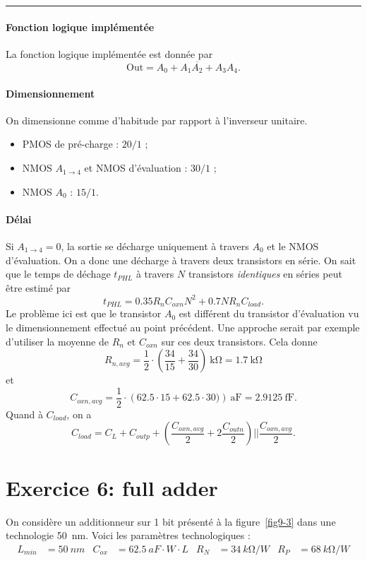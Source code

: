\documentclass[frenchb,DIV=14]{scrartcl}
\begin{document}
\hspace{1cm}\hrule\hspace{1cm}

\paragraph{Fonction logique implémentée}
La fonction logique implémentée est donnée par
\[ \text{Out} = \overline{A_0 + A_1A_2 + A_3A_4}.\]

\paragraph{Dimensionnement}
On dimensionne comme d'habitude par rapport à l'inverseur unitaire.
\begin{itemize}
	\item PMOS de pré-charge : $20/1$ ;
	\item NMOS $A_{1\to4}$ et NMOS d'évaluation : $30/1$ ;
	\item NMOS $A_0$ : $15/1$. 
\end{itemize}

\paragraph{Délai}
Si $A_{1\to4} = 0$, la sortie se décharge uniquement à travers $A_0$
et le NMOS d'évaluation. On a donc une décharge à travers deux transistors
en série. On sait que le temps de déchage $t_{PHL}$ à travers $N$
transistors \emph{identiques} en séries peut être estimé par
\[ t_{PHL} = 0.35R_nC_{oxn}N^2 + 0.7NR_nC_{load}. \]
Le problème ici est que le transistor $A_0$ est différent du transistor
d'évaluation vu le dimensionnement effectué au point précédent.
Une approche serait par exemple d'utiliser la moyenne de $R_n$ et $C_{oxn}$
sur ces deux transistors. Cela donne
\[ R_{n,avg} = \frac{1}{2} \cdot \left(\frac{34}{15} + \frac{34}{30}\right)\SI{}{\kilo\ohm}
= \SI{1.7}{\kilo\ohm} \]
et
\[ C_{oxn,avg} = \frac{1}{2} \cdot \left(62.5\cdot 15 + 62.5\cdot 30)\right)\SI{}{\atto\farad}
= \SI{2.9125}{\femto\farad}. \]
Quand à $C_{load}$, on a
\[ C_{load} = C_L + C_{outp} + (\frac{C_{oxn,avg}}{2} + 2\frac{C_{outn}}{2})
|| \frac{C_{oxn,avg}}{2}. \]

\section*{Exercice 6: full adder}

On considère un additionneur sur 1 bit présenté à la figure~\ref{fig9-3} dans
une technologie \SI{50}{nm}. Voici les paramètres technologiques :
\begin{align*}
    L_{min} &= \SI{50}{nm} &
    C_{ox} &= \SI{62.5}{aF}\cdot W\cdot L &
    R_N&=\SI{34}{k\ohm}/W &
    R_P&=\SI{68}{k\ohm}/W 
\end{align*}
\end{document}
